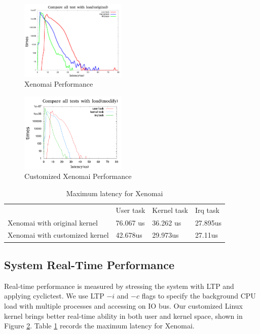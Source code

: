\documentclass[conference]{IEEEtran}
\begin{document}
\begin{figure}	
	\centering
	\includegraphics[width=2in]{img/xenomai_load.png}
	\caption{Xenomai Performance}
	\label{fig:xeno_perf}
\end{figure}

\begin{figure}
	\centering
	\includegraphics[width=2in]{img/xenomai_load_modify.png}
	\caption{Customized Xenomai Performance}
	\label{fig:xeno_perf_modify}
\end{figure}

\begin{table}[]
\centering
\caption{Maximum latency for Xenomai}
\label{xeno_compare}
\begin{tabular}{llll}
                              & User task & Kernel task & Irq task \\
Xenomai with original kernel  & 76.067 us & 36.262 us   & 27.895us \\
Xenomai with customized kernel & 42.678us  & 29.973us    & 27.11us 
\end{tabular}
\end{table}

\subsection{System Real-Time Performance}

Real-time performance is measured by stressing the system with LTP and applying cyclictest. \cite{cyclictest} We use LTP $-i$ and $-c$ flags to specify the background CPU load with multiple processes and accessing on IO bus. Our customized Linux kernel brings better real-time ability in both user and kernel space, shown in Figure \ref{fig:xeno_perf_modify}. Table \ref{xeno_compare} records the maximum latency for Xenomai.
\end{document}
